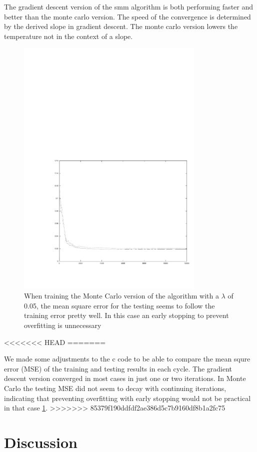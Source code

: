 \documentclass{bioinfo}
\begin{document}
\begin{application}
\par The gradient descent version of the smm algorithm is both performing faster and better than the monte carlo version. The speed of the convergence is determined by the derived slope in gradient descent. The monte carlo version lowers the temperature not in the context of a slope.
\begin{figure}[!tpb]
\centerline{\includegraphics[width=9cm]{overfitting_not.pdf}}
\caption{When training the Monte Carlo version of the algorithm with a $\lambda$ of 0.05, the mean square error for the testing seems to follow the training error pretty well. In this case an early stopping to prevent overfitting is unnecessary}
\label{fig:05}
\end{figure}
<<<<<<< HEAD
=======
\par We made some adjustments to the c code to be able to compare the mean squre error (MSE) of the training and testing results in each cycle. The gradient descent version converged in most cases in just one or two iterations. In Monte Carlo the testing MSE did not seem to decay with continuing iterations, indicating that preventing overfitting with early stopping would not be practical in that case \ref{fig:05}.
>>>>>>> 85379f190ddfdf2ae386d5c7b9160df8b1a2fc75

\section*{Discussion}




\end{application}
\end{document}
